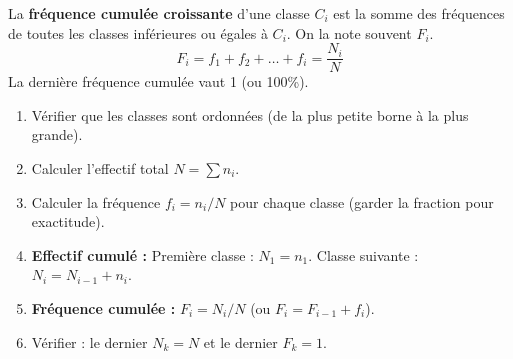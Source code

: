 \documentclass[11pt]{article}
\begin{document}
\begin{definition}
La \textbf{fréquence cumulée croissante} d'une classe $C_i$ est la somme des fréquences de toutes les classes inférieures ou égales à $C_i$.
On la note souvent $F_i$.
\[ F_i = f_1 + f_2 + \dots + f_i = \frac{N_i}{N} \]
La dernière fréquence cumulée vaut 1 (ou 100\%).
\end{definition}

\begin{methode}
\begin{enumerate}
    \item Vérifier que les classes sont ordonnées (de la plus petite borne à la plus grande).
    \item Calculer l'effectif total $N = \sum n_i$.
    \item Calculer la fréquence $f_i = n_i / N$ pour chaque classe (garder la fraction pour exactitude).
    \item \textbf{Effectif cumulé :} Première classe : $N_1 = n_1$. Classe suivante : $N_{i} = N_{i-1} + n_i$.
    \item \textbf{Fréquence cumulée :} $F_i = N_i / N$ (ou $F_{i} = F_{i-1} + f_i$).
    \item Vérifier : le dernier $N_k = N$ et le dernier $F_k = 1$.
\end{enumerate}
\end{methode}
\end{document}
